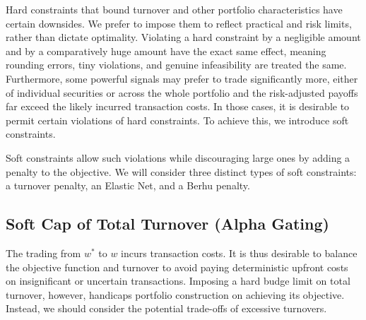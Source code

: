 \documentclass[11pt, letterpaper]{article}
\begin{document}
Hard constraints that bound turnover and other portfolio characteristics have certain downsides. We prefer to impose them to
reflect practical and risk limits, rather than dictate optimality. Violating a hard constraint by a negligible amount and by a
comparatively huge amount have the exact same effect, meaning rounding errors, tiny violations, and genuine infeasibility are
treated the same. Furthermore, some powerful signals may prefer to trade significantly more, either of individual securities or
across the whole portfolio and the risk-adjusted payoffs far exceed the likely incurred transaction costs. In those cases, it is
desirable to permit certain violations of hard constraints. To achieve this, we introduce soft constraints.

Soft constraints allow such violations while discouraging large ones by adding a penalty to the objective. We will consider three
distinct types of soft constraints: a turnover penalty, an Elastic Net, and a Berhu penalty.

\subsection{Soft Cap of Total Turnover (Alpha Gating)}
The trading from $w^*$ to $w$ incurs transaction costs. It is thus desirable to balance the objective function and turnover to
avoid paying deterministic upfront costs on insignificant or uncertain transactions. Imposing a hard budge limit on total
turnover, however, handicaps portfolio construction on achieving its objective. Instead, we should consider the potential
trade-offs of excessive turnovers.


\end{document}

